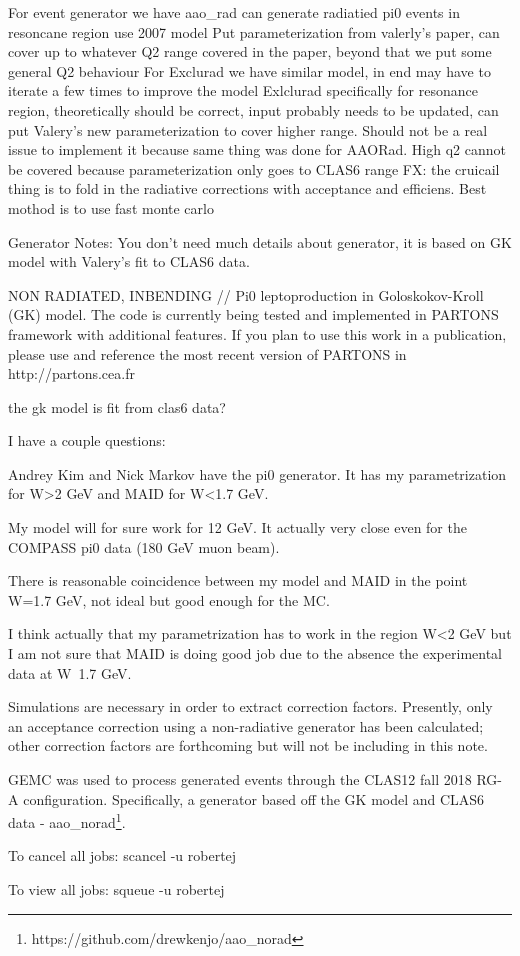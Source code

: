     For event generator we have aao\_rad can generate radiatied pi0 events in resoncane region use 2007 model
    Put parameterization from valerly’s paper, can cover up to whatever Q2 range covered in the paper, beyond that we put some general Q2 behaviour
    For Exclurad we have similar model, in end may have to iterate a few times to improve the model
    Exlclurad specifically for resonance region, theoretically should be correct, input probably needs to be updated, can put Valery’s new parameterization to cover higher range. Should not be a real issue to implement it because same thing was done for AAORad. High q2 cannot be covered because parameterization only goes to CLAS6 range
    FX: the cruicail thing is to fold in the radiative corrections with acceptance and efficiens. Best mothod is to use fast monte carlo




Generator Notes:
You don't need much details about generator, it is based on GK model with Valery's fit to CLAS6 data.

NON RADIATED, INBENDING
// Pi0 leptoproduction in Goloskokov-Kroll (GK) model. The code is currently being tested and implemented in PARTONS framework with additional features. If you plan to use this work in a publication, please use and reference the most recent version of PARTONS in http://partons.cea.fr 

the gk model is fit from clas6 data?

I have a couple questions:

Andrey Kim and Nick Markov have the pi0 generator. It has my parametrization for W>2 GeV and MAID for W<1.7 GeV.

My model will for sure work for 12 GeV. It actually very close even for the COMPASS pi0 data (180 GeV muon beam).

There is reasonable coincidence between my model and MAID in the point W=1.7 GeV, not ideal but good enough for the MC.

I think actually that my parametrization has to work in the region W<2 GeV but I am not sure that MAID is doing good job due to the absence the experimental data at W~1.7 GeV. 



    Simulations are necessary in order to extract correction factors. Presently, only an acceptance correction using a non-radiative generator has been calculated; other correction factors are forthcoming but will not be including in this note. 

    GEMC was used to process generated events through the CLAS12 fall 2018 RG-A configuration. Specifically, a generator based off the GK model and CLAS6 data - aao\_norad\footnote{https://github.com/drewkenjo/aao\_norad}. 
    



To cancel all jobs:
scancel -u robertej

To view all jobs:
squeue -u robertej

